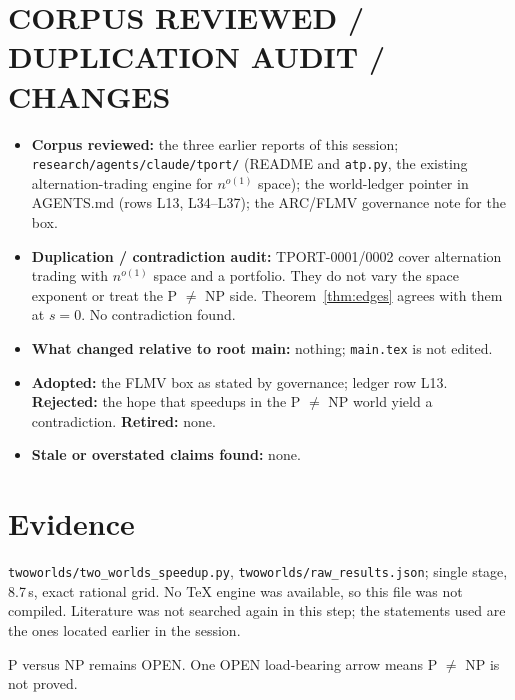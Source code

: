 \documentclass[11pt]{article}
\begin{document}
\section{CORPUS REVIEWED / DUPLICATION AUDIT / CHANGES}
\begin{itemize}
\item \textbf{Corpus reviewed:} the three earlier reports of this session; \texttt{research/agents/claude/tport/} (README and \texttt{atp.py}, the existing alternation-trading engine for $n^{o(1)}$ space); the world-ledger pointer in AGENTS.md (rows L13, L34--L37); the ARC/FLMV governance note for the box.
\item \textbf{Duplication / contradiction audit:} TPORT-0001/0002 cover alternation trading with $n^{o(1)}$ space and a portfolio. They do not vary the space exponent or treat the P $\ne$ NP side. Theorem~\ref{thm:edges} agrees with them at $s=0$. No contradiction found.
\item \textbf{What changed relative to root main:} nothing; \texttt{main.tex} is not edited.
\item \textbf{Adopted:} the FLMV box as stated by governance; ledger row L13. \textbf{Rejected:} the hope that speedups in the P $\ne$ NP world yield a contradiction. \textbf{Retired:} none.
\item \textbf{Stale or overstated claims found:} none.
\end{itemize}

\section{Evidence}
\texttt{twoworlds/two\_worlds\_speedup.py}, \texttt{twoworlds/raw\_results.json}; single stage, 8.7\,s, exact rational grid. No TeX engine was available, so this file was not compiled. Literature was not searched again in this step; the statements used are the ones located earlier in the session.

\medskip\noindent P versus NP remains OPEN. One OPEN load-bearing arrow means P $\ne$ NP is not proved.
\end{document}
